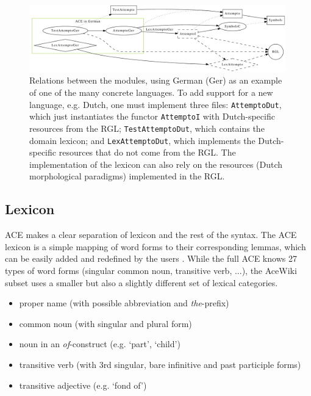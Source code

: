 \documentclass[a4paper]{article}
\begin{document}
\begin{figure}[ht]
\centering
\includegraphics[width=0.99\textwidth]{modules}
\caption[Relations between the ACE grammar modules]
{Relations between the modules, using German (Ger) as an example
of one of the many concrete languages. To add support for a new language,
e.g. Dutch, one must implement three files:
\texttt{AttemptoDut}, which just
instantiates the functor \texttt{AttemptoI} with Dutch-specific resources
from the RGL;
\texttt{TestAttemptoDut}, which contains the domain lexicon; and
\texttt{LexAttemptoDut}, which implements the Dutch-specific resources that
do not come from the RGL. The implementation of the lexicon can also
rely on the resources (Dutch morphological paradigms) implemented
in the RGL.}
\label{fig:modules}
\end{figure}

\subsection{Lexicon}

ACE makes a clear separation of lexicon and the rest of the syntax. The ACE
lexicon is a simple mapping of word forms to their corresponding lemmas, which
can be easily added and redefined by the users
\cite{ACE_6.6_Lexicon_Specification}. While the full ACE knows 27 types of
word forms (singular common noun, transitive verb, ...), the AceWiki subset
uses a smaller but also a slightly different set of lexical categories.

\begin{itemize}
\item proper name (with possible abbreviation and \emph{the}-prefix)
\item common noun (with singular and plural form)
\item noun in an \emph{of}-construct (e.g. `part', `child')
\item transitive verb (with 3rd singular, bare infinitive and past participle
forms)
\item transitive adjective (e.g. `fond of')
\end{itemize}
\end{document}
